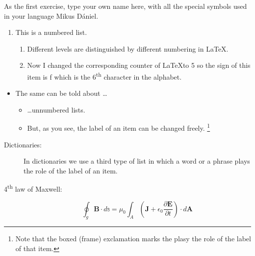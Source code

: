 \documentclass[12pt]{article}
\begin{document}
As the first exercise, type your own name here, with all the special symbols used in your language Mikus Dániel.
\begin{enumerate}
\item This is a numbered list.
\begin{enumerate}
\item Different levels are distinguished by different numbering in \LaTeX.
\setcounter{enumii}{5}
\item Now I changed the corresponding counter of \LaTeX to 5 so the sign of this item is f which is the 6\textsuperscript{th} character in the alphabet.
\end{enumerate}
\end{enumerate}

\begin{itemize}
\item The same can be told about \dots
\begin{itemize}
\item \dots unnumbered lists.
\item[\fbox{!!!}] But, as you see, the label of an item can be changed freely. \footnote{Note that the boxed (frame) exclamation marks the plasy the role of the label of that item.}
\end{itemize}
\end{itemize}

\begin{description}
\item[Dictionaries:] In dictionaries we use a third type of list in which a word or a phrase plays the role of the label of an item.
\item[4\textsuperscript{th} law of Maxwell:]
\begin{equation}
\oint_g \mathbf{B}\cdot d\mathbb{s}=\mu_0\int_A\left(\mathbf{J}+\epsilon_0\frac{\partial\mathbf{E}}{\partial t}\right)\cdot d\mathbf{A}
\end{equation}
\end{description}
\end{document}
